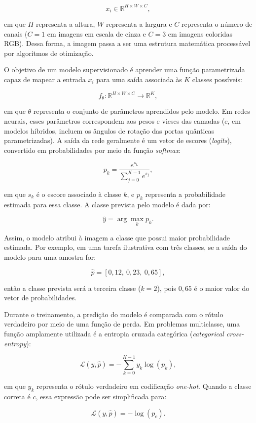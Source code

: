 \documentclass[
    12pt,
    openright,
    oneside,
    a4paper,
    english,
    brazil
]{abntex2}
\begin{document}
\[
x_i \in \mathbb{R}^{H \times W \times C},
\]

em que \(H\) representa a altura, \(W\) representa a largura e \(C\) representa o número de canais (\(C=1\) em imagens em escala de cinza e \(C=3\) em imagens coloridas RGB). Dessa forma, a imagem passa a ser uma estrutura matemática processável por algoritmos de otimização.

O objetivo de um modelo supervisionado é aprender uma função parametrizada capaz de mapear a entrada \(x_i\) para uma saída associada às \(K\) classes possíveis:

\[
f_{\theta}: \mathbb{R}^{H \times W \times C} \rightarrow \mathbb{R}^{K},
\]

em que \(\theta\) representa o conjunto de parâmetros aprendidos pelo modelo. Em redes neurais, esses parâmetros correspondem aos pesos e vieses das camadas (e, em modelos híbridos, incluem os ângulos de rotação das portas quânticas parametrizadas). A saída da rede geralmente é um vetor de escores (\textit{logits}), convertido em probabilidades por meio da função \textit{softmax}:

\[
p_k =
\frac{e^{s_k}}
{\sum_{j=0}^{K-1} e^{s_j}},
\]

em que \(s_k\) é o escore associado à classe \(k\), e \(p_k\) representa a probabilidade estimada para essa classe. A classe prevista pelo modelo é dada por:

\[
\hat{y} =
\arg\max_k p_k.
\]

Assim, o modelo atribui à imagem a classe que possui maior probabilidade estimada. Por exemplo, em uma tarefa ilustrativa com três classes, se a saída do modelo para uma amostra for:

\[
\hat{p} = [0{,}12,\ 0{,}23,\ 0{,}65],
\]

então a classe prevista será a terceira classe (\(k=2\)), pois \(0{,}65\) é o maior valor do vetor de probabilidades.

Durante o treinamento, a predição do modelo é comparada com o rótulo verdadeiro por meio de uma função de perda. Em problemas multiclasse, uma função amplamente utilizada é a entropia cruzada categórica (\textit{categorical cross-entropy}):

\[
\mathcal{L}(y,\hat{p}) =
-\sum_{k=0}^{K-1}
y_k \log(p_k),
\]

em que \(y_k\) representa o rótulo verdadeiro em codificação \textit{one-hot}. Quando a classe correta é \(c\), essa expressão pode ser simplificada para:

\[
\mathcal{L}(y,\hat{p}) =
-\log(p_c).
\]
\end{document}
